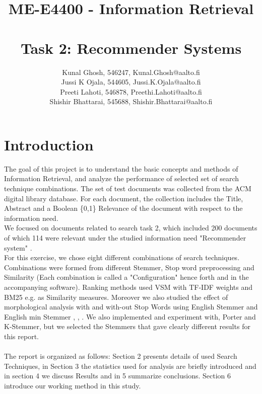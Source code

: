 \documentclass[report,draft*]{aaltoseries}
\author{Kunal Ghosh, 546247, Kunal.Ghosh@aalto.fi\\ Jussi K Ojala, 544605, Jussi.K.Ojala@aalto.fi \\Preeti Lahoti, 546878, Preethi.Lahoti@aalto.fi \\Shishir Bhattarai, 545688, Shishir.Bhattarai@aalto.fi}
\title{ME-E4400 - Information Retrieval \\\\ Task 2: Recommender Systems}
\begin{document}

\let\cleardoublepage\clearpage
\tableofcontents

\clearpage
\section{Introduction}
The goal of this project is to understand the basic concepts and methods of Information Retrieval, and analyze the performance of selected set of search technique combinations. The set of test documents was collected from the ACM digital library database. For each document, the collection includes the Title, Abstract and a Boolean \{0,1\} Relevance of the document with respect to the information need. \\
We focused on documents related to search task 2, which included 200 documents of which 114 were relevant under the studied information need "Recommender system" . \\
For this exercise, we chose eight different combinations of search techniques. Combinations were formed from different Stemmer, Stop word preprocessing and Similarity (Each combination is called a "Configuration" hence forth and in the accompanying software). Ranking methods used VSM with TF-IDF weights and BM25 e.g. \cite{Manning08}  as Similarity measures. Moreover we also studied the effect of morphological analysis with and with-out Stop Words using English Stemmer and English min Stemmer \cite{Porter80}, \cite{Porter01}, \cite{Krovetz93}. We also implemented and experiment with, Porter and K-Stemmer, but we selected the Stemmers that gave clearly different results for this report.

\paragraph{}
The report is organized as follows: Section 2 presents details of used Search Techniques, in Section 3 the statistics used for analysis are briefly introduced and in section 4 we discuss Results and in 5 summarize conclusions. Section 6 introduce our working method in this study.
\end{document}
